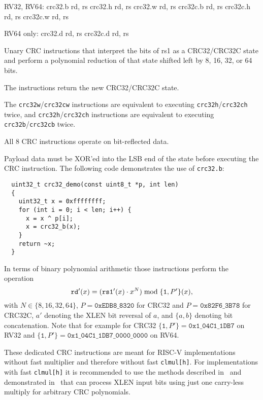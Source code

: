 \begin{rvb}
  RV32, RV64:
    crc32.b rd, rs
    crc32.h rd, rs
    crc32.w rd, rs
    crc32c.b rd, rs
    crc32c.h rd, rs
    crc32c.w rd, rs

  RV64 only:
    crc32.d rd, rs
    crc32c.d rd, rs
\end{rvb}

Unary CRC instructions that interpret the bits of rs1 as a CRC32/CRC32C state
and perform a polynomial reduction of that state shifted left by 8, 16, 32, or
64 bits.

The instructions return the new CRC32/CRC32C state.

The \texttt{crc32w}/\texttt{crc32cw} instructions are equivalent to executing
\texttt{crc32h}/\texttt{crc32ch} twice, and \texttt{crc32h}/\texttt{crc32ch}
instructions are equivalent to executing \texttt{crc32b}/\texttt{crc32cb}
twice.

All 8 CRC instructions operate on bit-reflected data.



Payload data must be XOR'ed into the LSB end of the state before executing the
CRC instruction. The following code demonstrates the use of \texttt{crc32.b}:

\begin{minipage}{\linewidth}
\begin{verbatim}
  uint32_t crc32_demo(const uint8_t *p, int len)
  {
    uint32_t x = 0xffffffff;
    for (int i = 0; i < len; i++) {
      x = x ^ p[i];
      x = crc32_b(x);
    }
    return ~x;
  }
\end{verbatim}
\end{minipage}

In terms of binary polynomial arithmetic those instructions perform the operation
$$ \texttt{rd}'(x) = (\texttt{rs1}'(x) \cdot x^N) \; \textrm{mod} \; \{\texttt{1}, P'\}(x)\textrm, $$
with $N \in \{8, 16, 32, 64\}$,
$P = \texttt{0xEDB8\_8320}$ for CRC32 and $P = \texttt{0x82F6\_3B78}$ for CRC32C,
$a'$ denoting the XLEN bit reversal of $a$,
and $\{a, b\}$ denoting bit concatenation.
Note that for example for CRC32 $\{\texttt{1}, P'\} = \texttt{0x1\_04C1\_1DB7}$
on RV32 and $\{\texttt{1}, P'\} = \texttt{0x1\_04C1\_1DB7\_0000\_0000}$ on RV64.

These dedicated CRC instructions are meant for RISC-V implementations without fast multiplier
and therefore without fast \texttt{clmul[h]}. For implementations with fast \texttt{clmul[h]}
it is recommended to use the methods described in~\cite{FastCRC} and demonstrated in~\cite{Wolf18A}
that can process XLEN input bits using just one carry-less multiply for arbitrary CRC polynomials.

